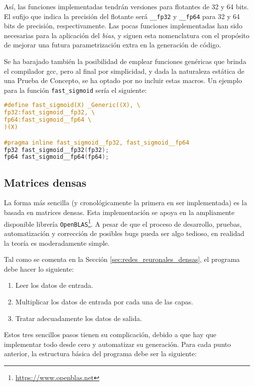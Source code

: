 Así, las funciones implementadas tendrán versiones para flotantes de 32 y 64 bits. El sufijo que indica la precisión del flotante será \texttt{\_\_fp32} y \texttt{\_\_fp64} para 32 y 64 bits de precisión, respectivamente. Las pocas funciones implementadas han sido necesarias para la aplicación del \textit{bias}, y siguen esta nomenclatura con el propósito de mejorar una futura parametrización extra en la generación de código.

Se ha barajado también la posibilidad de emplear funciones genéricas que brinda el compilador gcc, pero al final por simplicidad, y dada la naturaleza estática de una Prueba de Concepto, se ha optado por no incluir estas macros. Un ejemplo para la función \texttt{fast\_sigmoid} sería el siguiente:\medskip
\begin{lstlisting}[language=C]
#define fast_sigmoid(X) _Generic((X), \
fp32:fast_sigmoid__fp32, \
fp64:fast_sigmoid__fp64 \
)(X)

#pragma inline fast_sigmoid__fp32, fast_sigmoid__fp64
fp32 fast_sigmoid__fp32(fp32);
fp64 fast_sigmoid__fp64(fp64);
\end{lstlisting}


\subsection{Matrices densas}
\label{ssec_gdin_matrices_densas}
La forma más sencilla (y cronológicamente la primera en ser implementada) es la basada en matrices densas. Esta implementación se apoya en la ampliamente disponible librería \texttt{OpenBLAS}\footnote{\url{https://www.openblas.net}}. A pesar de que el proceso de desarrollo, pruebas, automatización y corrección de posibles bugs pueda ser algo tedioso, en realidad la teoría es moderadamente simple.

Tal como se comenta en la Sección \ref{sec:redes_reuronales_densas}, el programa debe hacer lo siguiente:

\begin{enumerate}
    \item Leer los datos de entrada.
    \item Multiplicar los datos de entrada por cada una de las capas.
    \item Tratar adecuadamente los datos de salida.
\end{enumerate}

Estos tres sencillos pasos tienen su complicación, debido a que hay que implementar todo desde cero y automatizar su generación. Para cada punto anterior, la estructura básica del programa debe ser la siguiente:

